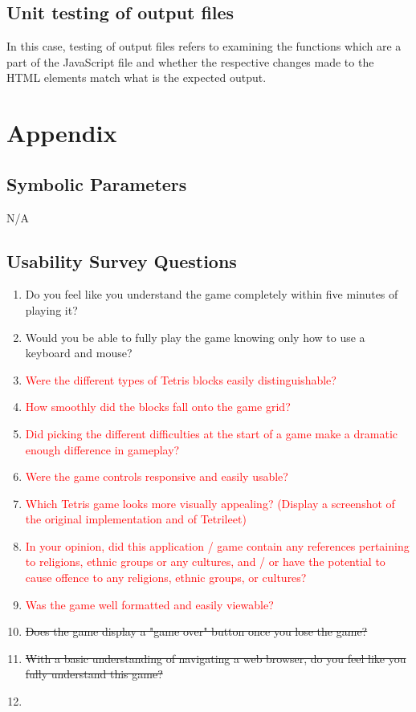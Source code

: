 \documentclass[12pt, titlepage]{article}
\begin{document}
\subsection{Unit testing of output files}
        In this case, testing of output files refers to examining the functions which are a part of the JavaScript file and whether the respective changes made to the HTML elements match what is the expected output.





\newpage

\section{Appendix}

\subsection{Symbolic Parameters}

N/A

\subsection{Usability Survey Questions}

\begin{enumerate}
    \item Do you feel like you understand the game completely within five minutes of playing it?
    \item Would you be able to fully play the game knowing only how to use a keyboard and mouse?
    \item \textcolor{red}{Were the different types of Tetris blocks easily distinguishable?}
    \item \textcolor{red}{How smoothly did the blocks fall onto the game grid?}
    \item \textcolor{red}{Did picking the different difficulties at the start of a game make a dramatic enough difference in gameplay?}
    \item \textcolor{red}{Were the game controls responsive and easily usable?}
    \item \textcolor{red}{Which Tetris game looks more visually appealing? (Display a screenshot of the original implementation and of Tetrileet)}
    \item \textcolor{red}{In your opinion, did this application / game contain any references pertaining to religions, ethnic groups or any cultures, and / or have the potential to cause offence to any religions, ethnic groups, or cultures?}
    \item \textcolor{red}{Was the game well formatted and easily viewable?}
    \item \sout{Does the game display a "game over" button once you lose the game?}
    \item \sout{With a basic understanding of navigating a web browser, do you feel like you fully understand this game?}
    \item \textcolor{red}{}
\end{enumerate}
\end{document}
